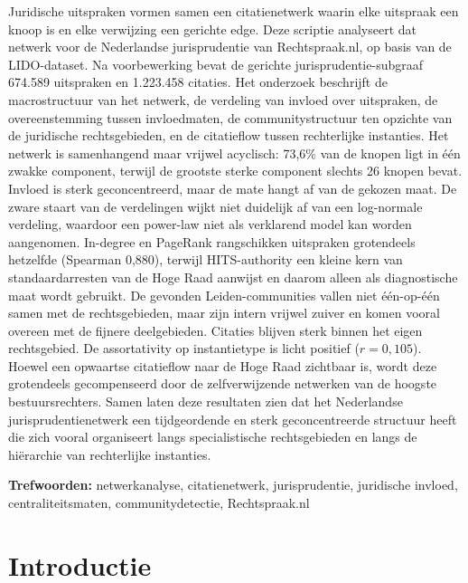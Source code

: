\documentclass[a4paper, 12pt]{report}
\begin{document}
\noindent
Juridische uitspraken vormen samen een citatienetwerk waarin elke uitspraak een knoop is en elke verwijzing een gerichte edge. Deze scriptie analyseert dat netwerk voor de Nederlandse jurisprudentie van Rechtspraak.nl, op basis van de LIDO-dataset. Na voorbewerking bevat de gerichte jurisprudentie-subgraaf 674.589 uitspraken en 1.223.458 citaties. Het onderzoek beschrijft de macrostructuur van het netwerk, de verdeling van invloed over uitspraken, de overeenstemming tussen invloedmaten, de communitystructuur ten opzichte van de juridische rechtsgebieden, en de citatieflow tussen rechterlijke instanties. Het netwerk is samenhangend maar vrijwel acyclisch: 73,6\% van de knopen ligt in één zwakke component, terwijl de grootste sterke component slechts 26 knopen bevat. Invloed is sterk geconcentreerd, maar de mate hangt af van de gekozen maat. De zware staart van de verdelingen wijkt niet duidelijk af van een log-normale verdeling, waardoor een power-law niet als verklarend model kan worden aangenomen. In-degree en PageRank rangschikken uitspraken grotendeels hetzelfde (Spearman 0,880), terwijl HITS-authority een kleine kern van standaardarresten van de Hoge Raad aanwijst en daarom alleen als diagnostische maat wordt gebruikt. De gevonden Leiden-communities vallen niet één-op-één samen met de rechtsgebieden, maar zijn intern vrijwel zuiver en komen vooral overeen met de fijnere deelgebieden. Citaties blijven sterk binnen het eigen rechtsgebied. De assortativity op instantietype is licht positief ($r = 0{,}105$). Hoewel een opwaartse citatieflow naar de Hoge Raad zichtbaar is, wordt deze grotendeels gecompenseerd door de zelfverwijzende netwerken van de hoogste bestuursrechters. Samen laten deze resultaten zien dat het Nederlandse jurisprudentienetwerk een tijdgeordende en sterk geconcentreerde structuur heeft die zich vooral organiseert langs specialistische rechtsgebieden en langs de hiërarchie van rechterlijke instanties.


\vspace{0.4cm}
\noindent
\textbf{Trefwoorden:} netwerkanalyse, citatienetwerk, jurisprudentie, juridische invloed, centraliteitsmaten, communitydetectie, Rechtspraak.nl

\newpage


\setcounter{page}{1}
\pagestyle{plain}
\tableofcontents

\newpage



\chapter{Introductie}
\label{ch:intro}
\end{document}
